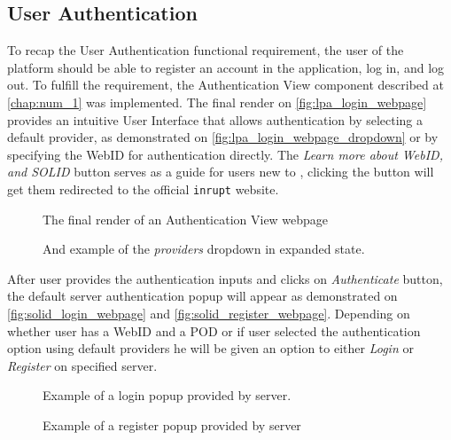 \subsection{User Authentication}

To recap the User Authentication functional requirement, the user of the platform should be able to register an account in the application, log in, and log out. To fulfill the requirement, the Authentication View component described at \autoref{chap:num_1} was implemented. The final render on \autoref{fig:lpa_login_webpage} provides an intuitive User Interface that allows authentication by selecting a default \solid{} provider, as demonstrated on \autoref{fig:lpa_login_webpage_dropdown} or by specifying the WebID for authentication directly. The \textit{Learn more about WebID, and SOLID} button serves as a guide for users new to \solid{}, clicking the button will get them redirected to the official \texttt{inrupt} website. 

\begin{figure}[hbt]
  \caption{The final render of an Authentication View webpage}
  \label{fig:lpa_login_webpage}
\endminipage\hfill
{}
  \caption{And example of the \textit{providers} dropdown in expanded state.}
  \label{fig:lpa_login_webpage_dropdown}
\endminipage\hfill
\end{figure}

After user provides the authentication inputs and clicks on \textit{Authenticate} button, the default \solid{} server authentication popup will appear as demonstrated on \autoref{fig:solid_login_webpage} and \autoref{fig:solid_register_webpage}. Depending on whether user has a WebID and a \solid{} POD or if user selected the authentication option using default providers he will be given an option to either \textit{Login} or \textit{Register} on specified \solid{} server. 

\begin{figure}[hbt]
  \caption{Example of a login popup provided by \solid{} server.}
  \label{fig:solid_login_webpage}
\endminipage\hfill
{}
  \caption{Example of a register popup provided by \solid{} server}
  \label{fig:solid_register_webpage}
\endminipage\hfill
\end{figure}

